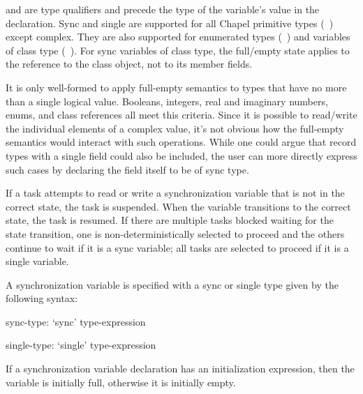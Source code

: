  and  are type qualifiers and precede
the type of the variable's value in the declaration.  Sync and single
are supported for all Chapel primitive types (~)
except complex.  They are also supported for enumerated types
(~) and variables of class type
(~).  For sync variables of class type, the
full/empty state applies to the reference to the class object, not to
its member fields.

\begin{rationale}
It is only well-formed to apply full-empty semantics to types that
have no more than a single logical value.  Booleans, integers, real
and imaginary numbers, enums, and class references all meet this
criteria.  Since it is possible to read/write the individual elements
of a complex value, it's not obvious how the full-empty semantics
would interact with such operations.  While one could argue that
record types with a single field could also be included, the user can
more directly express such cases by declaring the field itself to be
of sync type.
\end{rationale}

If a task attempts to read or write a synchronization variable that is
not in the correct state, the task is suspended.  When the variable
transitions to the correct state, the task is resumed.  If there are
multiple tasks blocked waiting for the state transition, one is
non-deterministically selected to proceed and the others continue to
wait if it is a sync variable; all tasks are selected to proceed
if it is a single variable.

%
%

A synchronization variable is specified with a sync or single type
given by the following syntax:
\begin{syntax}
sync-type:
  `sync' type-expression

single-type:
  `single' type-expression
\end{syntax}

If a synchronization variable declaration has an initialization
expression, then the variable is initially full, otherwise it is
initially empty.

